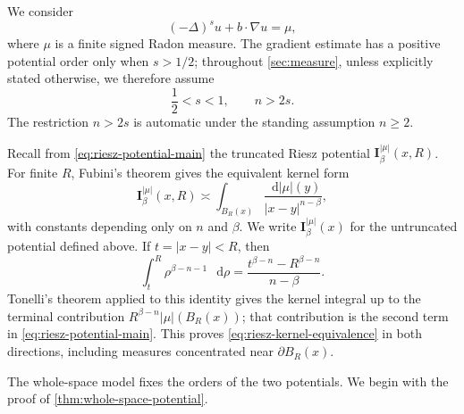 \documentclass[reqno]{amsart}
\numberwithin{equation}{section}
\theoremstyle{plain}
\theoremstyle{definition}
\theoremstyle{remark}
\newcommand{\I}{\mathbf I}
\newcommand{\differential}{\mathop{}\!\mathrm d}
\begin{document}
We consider
\begin{equation}\label{eq:measure-equation}
 (-\Delta)^s u+b\cdot\nabla u=\mu,
\end{equation}
where $\mu$ is a finite signed Radon measure.  The gradient estimate has a
positive potential order only when $s>1/2$; throughout
\cref{sec:measure}, unless explicitly stated otherwise, we therefore assume
\[
 \frac12<s<1,\qquad n>2s.
\]
The restriction $n>2s$ is automatic under the standing assumption $n\ge2$.

Recall from \eqref{eq:riesz-potential-main} the truncated Riesz
potential $\I_\beta^{|\mu|}(x,R)$.
For finite $R$, Fubini's theorem gives the equivalent kernel form
\begin{equation}\label{eq:riesz-kernel-equivalence}
 \I_\beta^{|\mu|}(x,R)
 \asymp
 \int_{B_R(x)}\frac{\differential|\mu|(y)}{|x-y|^{n-\beta}},
\end{equation}
with constants depending only on $n$ and $\beta$.  We write
$\I_\beta^{|\mu|}(x)$ for the untruncated potential defined above.
If $t=|x-y|<R$, then
\[
 \int_t^R\rho^{\beta-n-1}\,\differential\rho
 =\frac{t^{\beta-n}-R^{\beta-n}}{n-\beta}.
\]
Tonelli's theorem applied to this identity gives the kernel integral up to
the terminal contribution $R^{\beta-n}|\mu|(B_R(x))$; that contribution is
the second term in \eqref{eq:riesz-potential-main}.  This proves
\eqref{eq:riesz-kernel-equivalence} in both directions, including measures
concentrated near $\partial B_R(x)$.

The whole-space model fixes the orders of the two potentials.  We begin with
the proof of \cref{thm:whole-space-potential}.
\end{document}
